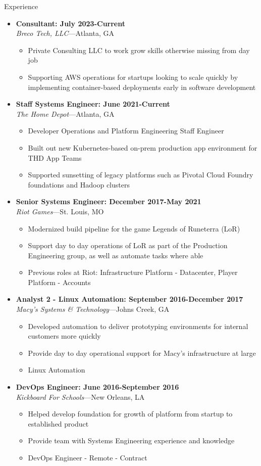 \documentclass[10pt,oneside]{article}
\newenvironment{ressection}[1]{
    \vspace{4pt}
    {\fontfamily{phv}\selectfont\Large#1}
    \begin{itemize}
    \vspace{3pt}
}{
    \end{itemize}
}
\newcommand{\ressubitem}[1]{
    \vspace{-1pt}
    \item \begin{flushleft} #1 \end{flushleft}
}
\newcommand{\resbigitem}[3]{
    \vspace{-5pt}
    \item
    \textbf{#3} \\
    \textit{#1}---#2
}
\newenvironment{ressubsec}[3]{
    \resbigitem{#1}{#2}{#3}
    \vspace{-2pt}
    \begin{itemize}
}{
    \end{itemize}
}
\begin{document}
\begin{ressection}{Experience}
    \begin{ressubsec}{Breco Tech, LLC}{Atlanta, GA}{Consultant: July 2023-Current}
        \ressubitem{Private Consulting LLC to work grow skills otherwise missing from day job}
        \ressubitem{Supporting AWS operations for startups looking to scale quickly by implementing container-based deployments early in software development}
    \end{ressubsec}

    \begin{ressubsec}{The Home Depot}{Atlanta, GA}{Staff Systems Engineer: June 2021-Current}
        \ressubitem{Developer Operations and Platform Engineering Staff Engineer}
        \ressubitem{Built out new Kubernetes-based on-prem production app environment for THD App Teams}
        \ressubitem{Supported sunsetting of legacy platforms such as Pivotal Cloud Foundry foundations and Hadoop clusters}
    \end{ressubsec}

    \begin{ressubsec}{Riot Games}{St. Louis, MO}{Senior Systems Engineer: December 2017-May 2021}
        \ressubitem{Modernized build pipeline for the game Legends of Runeterra (LoR)}
        \ressubitem{Support day to day operations of LoR as part of the Production Engineering group, as well as automate tasks where able}
        \ressubitem{Previous roles at Riot: Infrastructure Platform - Datacenter, Player Platform - Accounts}
    \end{ressubsec}

    \begin{ressubsec}{Macy's Systems \& Technology}{Johns Creek, GA}{Analyst 2 - Linux Automation: September 2016-December 2017}
        \ressubitem{Developed automation to deliver prototyping environments for internal customers more quickly}
        \ressubitem{Provide day to day operational support for Macy's infrastructure at large}
        \ressubitem{Linux Automation}
    \end{ressubsec}

    \begin{ressubsec}{Kickboard For Schools}{New Orleans, LA}{DevOps Engineer: June 2016-September 2016}
        \ressubitem{Helped develop foundation for growth of platform from startup to established product}
        \ressubitem{Provide team with Systems Engineering experience and knowledge}
        \ressubitem{DevOps Engineer - Remote - Contract}
    \end{ressubsec}


\end{ressection}
\end{document}
